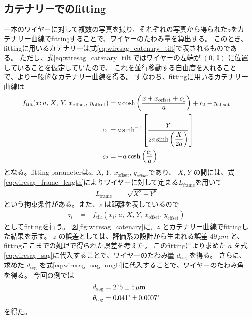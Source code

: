 \documentclass[../../main.tex]{subfiles}
\begin{document}
\subsection{カテナリーでのfitting}
一本のワイヤーに対して複数の写真を撮り、それぞれの写真から得られた$z$をカテナリー曲線でfittingすることで、ワイヤーのたわみ量を算出する。
このとき、fittingに用いるカテナリーは式\eqref{eq:wiresag_catenary_tilt}で表されるものである。
ただし、式\eqref{eq:wiresag_catenary_tilt}ではワイヤーの左端が $(0,\,0)$ に位置していることを仮定していたので、
これを並行移動する自由度を入れることで、より一般的なカテナリー曲線を得る。
すなわち、fittingに用いるカテナリー曲線は
\begin{align}
    f_{\mathrm{tilt}}(x;a,\,X,\,Y,\,x_{\mathrm{offset}},\,y_{\mathrm{offset}}) &= a\cosh\qty(\dfrac{x+x_{\mathrm{offset}}+c_1}{a}) + c_2 - y_{\mathrm{offset}}\\
    c_1 &= a\sinh^{-1}\qty[\dfrac{Y}{2a\sinh\qty(\dfrac{X}{2a})}] \\
    c_2 &= -a\cosh\qty(\dfrac{c_1}{a})
\end{align}
となる。fitting parameterは$a,\,X,\,Y,\,x_{\mathrm{offset}},\,y_{\mathrm{offset}}$であり、
$X,\,Y$ の間には、式\eqref{eq:wiresag_frame_length}によりワイヤーに対して定まる$L_{\mathrm{frame}}$を用いて
\begin{align}
    L_{\mathrm{frame}} &= \sqrt{X^2+Y^2}
\end{align}
という拘束条件がある。また、$z$ は距離を表しているので
\begin{align}
    z_{i} &= -f_{\mathrm{tilt}}(x_{i};\,a,\,X,\,Y,\,x_{\mathrm{offset}},\,y_{\mathrm{offset}})
\end{align}
としてfittingを行う。
図\ref{fig:wiresag_catenary}に、$z$ とカテナリー曲線でfittingした結果を示す。
$z$ の誤差としては、評価系の設計から生まれる誤差 $\SI{49}{\mu m}$ と、fittingここまでの処理で得られた誤差を考えた。
このfittingにより求めた $a$ を式\eqref{eq:wiresag_sag}に代入することで、ワイヤーのたわみ量 $d_{\mathrm{sag}}$ を得る。
さらに、求めた $d_{\mathrm{sag}}$ を式\eqref{eq:wiresag_sag_angle}に代入することで、ワイヤーのたわみ角を得る。
今回の例では
\begin{align}
    d_{\mathrm{sag}} &= 275 \pm \SI{5}{\mu m} \\
    \theta_{\mathrm{sag}} &= 0.041\tcdegree \pm 0.0007 \tcdegree
\end{align}
を得た。
\end{document}
